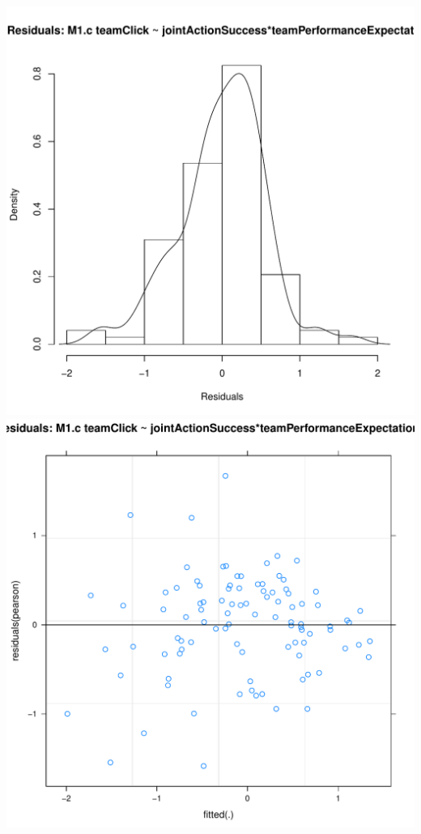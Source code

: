 \documentclass[12pt]{report}
\begin{document}
\centering
\newpage
\includegraphics[scale =.4]{../images/MLM1cHist.pdf}
\includegraphics[scale =.4]{../images/MLM1cScatter.pdf}
\end{document}
